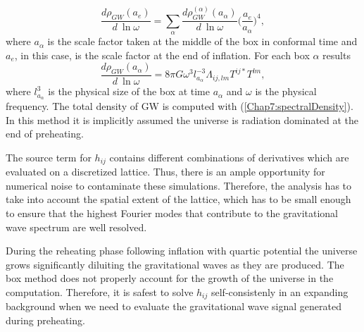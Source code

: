 \documentclass[11pt,a4paper,twoside]{book}
\begin{document}
\begin{equation}
\label{Chap7:SumUpEnergyDensityBoxMethod}
\frac{d\rho_{GW}(a_{e})}{d\ \ln \omega} = \sum_{\alpha} \frac{d\rho_{GW}^{(\alpha)}(a_{\alpha})}{d\ \ln \omega} \Bigg(\frac{a_{e}}{a_{\alpha}}\Bigg)^{4},
\end{equation}
where $ a_{\alpha} $ is the scale factor taken at the middle of the box in conformal time and $ a_{e} $, in this case, is the scale factor at the end of inflation. For each box $\alpha$ results
\begin{equation}
\label{BoxMethod_EnergyDensityEmitted}
\frac{d\rho_{GW}(a_{\alpha})}{d\ \ln \omega}=8\pi G \omega^{3}l^{-3}_{a_{\alpha}}\Lambda_{ij,lm}T^{ij*}T^{lm},
\end{equation}
where $ l^{3}_{a_{\alpha}} $ is the physical size of the box at time $ a_{\alpha} $ and $\omega$ is the physical frequency. The total density of GW is computed with (\ref{Chap7:spectralDensity}). In this method it is implicitly assumed the universe is radiation dominated at the end of preheating.

The source term for $ h_{ij} $ contains different  combinations of derivatives which are evaluated on a discretized lattice. Thus, there is an ample opportunity for numerical noise to contaminate these simulations. Therefore, the analysis has to take into account the spatial extent of the lattice, which has to be small enough to ensure that the highest Fourier modes that contribute to the gravitational wave spectrum are well resolved.

During the reheating phase  following inflation with quartic potential the universe grows significantly diluiting the gravitational waves as they are produced. The box method does not properly account for the growth of the universe in the computation. Therefore, it is safest to solve $ h_{ij} $ self-consistenly in an expanding background when we need to evaluate the gravitational wave signal generated during preheating.
\end{document}
